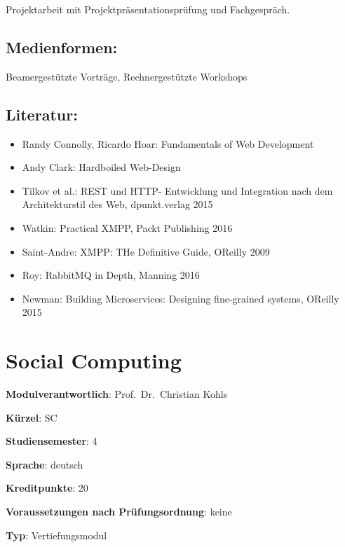 Projektarbeit mit Projektpräsentationsprüfung und Fachgespräch.

\section*{Medienformen:}\label{medienformen-17}

Beamergestützte Vorträge, Rechnergestützte Workshops

\section*{Literatur:}\label{literatur-22}

\begin{itemize}
\tightlist
\item
  Randy Connolly, Ricardo Hoar: Fundamentals of Web Development
\item
  Andy Clark: Hardboiled Web-Design
\item
  Tilkov et al.: REST und HTTP- Entwicklung und Integration nach dem
  Architekturstil des Web, dpunkt.verlag 2015
\item
  Watkin: Practical XMPP, Packt Publishing 2016
\item
  Saint-Andre: XMPP: THe Definitive Guide, OReilly 2009
\item
  Roy: RabbitMQ in Depth, Manning 2016
\item
  Newman: Building Microservices: Designing fine-grained systems,
  OReilly 2015
\end{itemize}

\chapter{Social Computing}\label{social-computing}

\begin{modulHead}
\textbf{Modulverantwortlich}: Prof.~Dr.~Christian
Kohls
\end{modulHead}
\begin{modulHead}
\textbf{Kürzel}:
SC
\end{modulHead}
\begin{modulHead}
\textbf{Studiensemester}:
4
\end{modulHead}
\begin{modulHead}
\textbf{Sprache}:
deutsch
\end{modulHead}
\begin{modulHead}
\textbf{Kreditpunkte}:
20
\end{modulHead}
\begin{modulHead}
\textbf{Voraussetzungen nach
Prüfungsordnung}: keine
\end{modulHead}
\begin{modulHead}
\textbf{Typ}:
Vertiefungsmodul
\end{modulHead}


